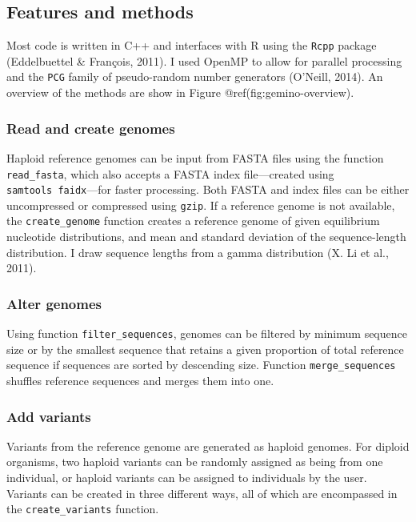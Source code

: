 \documentclass[12pt,]{article}
\begin{document}
\hypertarget{features-and-methods}{%
\subsection{Features and methods}\label{features-and-methods}}

Most code is written in C++ and interfaces with R using the
\texttt{Rcpp} package (Eddelbuettel \& François, 2011). I used OpenMP to
allow for parallel processing and the \texttt{PCG} family of
pseudo-random number generators (O'Neill, 2014). An overview of the
methods are show in Figure @ref(fig:gemino-overview).

\hypertarget{read-and-create-genomes}{%
\subsubsection{Read and create genomes}\label{read-and-create-genomes}}

Haploid reference genomes can be input from FASTA files using the
function \texttt{read\_fasta}, which also accepts a FASTA index
file---created using \texttt{samtools\ faidx}---for faster processing.
Both FASTA and index files can be either uncompressed or compressed
using \texttt{gzip}. If a reference genome is not available, the
\texttt{create\_genome} function creates a reference genome of given
equilibrium nucleotide distributions, and mean and standard deviation of
the sequence-length distribution. I draw sequence lengths from a gamma
distribution (X. Li et al., 2011).

\hypertarget{alter-genomes}{%
\subsubsection{Alter genomes}\label{alter-genomes}}

Using function \texttt{filter\_sequences}, genomes can be filtered by
minimum sequence size or by the smallest sequence that retains a given
proportion of total reference sequence if sequences are sorted by
descending size. Function \texttt{merge\_sequences} shuffles reference
sequences and merges them into one.

\hypertarget{add-variants}{%
\subsubsection{Add variants}\label{add-variants}}

Variants from the reference genome are generated as haploid genomes. For
diploid organisms, two haploid variants can be randomly assigned as
being from one individual, or haploid variants can be assigned to
individuals by the user. Variants can be created in three different
ways, all of which are encompassed in the \texttt{create\_variants}
function.
\end{document}
